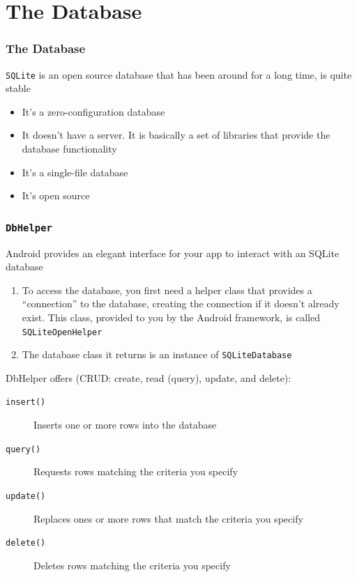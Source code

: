 \section{The Database}
\begin{frame}
\frametitle{The Database}
\texttt{SQLite} is an open source database that has been around for a long time, is quite stable
\begin{itemize}
\item It’s a zero-configuration database
\item It doesn’t have a server. It is basically
a set of libraries that provide the database functionality
\item It’s a single-file database
\item It’s open source
\end{itemize}
\end{frame}
\begin{frame}
\frametitle{\texttt{DbHelper}}
Android provides an elegant interface for your app to interact with an SQLite database
\begin{enumerate}
\item To access the database, you first need a helper class that provides a ``connection'' to
the database, creating the connection if it doesn’t already exist. This class, provided to
you by the Android framework, is called \alert{\texttt{SQLiteOpenHelper}}
\item The database class it returns is an instance of \alert{\texttt{SQLiteDatabase}}
\end{enumerate}

DbHelper offers (CRUD: create, read (query), update, and delete):
\begin{description}
\item [\texttt{insert()}] Inserts one or more rows into the database
\item [\texttt{query()}] Requests rows matching the criteria you specify
\item [\texttt{update()}] Replaces ones or more rows that match the criteria you specify
\item [\texttt{delete()}] Deletes rows matching the criteria you specify
\end{description}
\end{frame}
